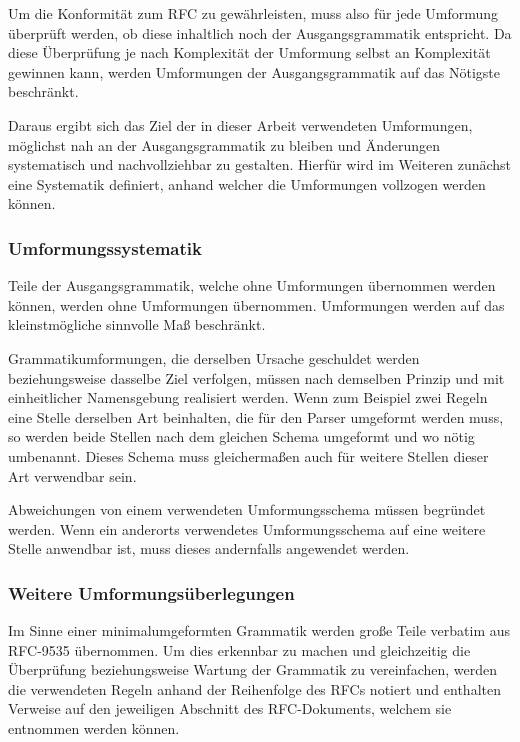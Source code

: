 \documentclass[oneside]{ausarbeitung}
\begin{document}
Um die Konformität zum RFC zu gewährleisten, muss also für jede Umformung überprüft werden, ob diese inhaltlich noch der Ausgangsgrammatik entspricht. Da diese Überprüfung je nach Komplexität der Umformung selbst an Komplexität gewinnen kann, werden Umformungen der Ausgangsgrammatik auf das Nötigste beschränkt. 
	
Daraus ergibt sich das Ziel der in dieser Arbeit verwendeten Umformungen, möglichst nah an der Ausgangsgrammatik zu bleiben und Änderungen systematisch und nachvollziehbar zu gestalten. Hierfür wird im Weiteren zunächst eine Systematik definiert, anhand welcher die Umformungen vollzogen werden können.
	
\subsubsection{Umformungssystematik}
	
Teile der Ausgangsgrammatik, welche ohne Umformungen übernommen werden können, werden ohne Umformungen übernommen. Umformungen werden auf das kleinstmögliche sinnvolle Maß beschränkt.
	
Grammatikumformungen, die derselben Ursache geschuldet werden beziehungsweise dasselbe Ziel verfolgen, müssen nach demselben Prinzip und mit einheitlicher Namensgebung realisiert werden. Wenn zum Beispiel zwei Regeln eine Stelle derselben Art beinhalten, die für den Parser umgeformt werden muss, so werden beide Stellen nach dem gleichen Schema umgeformt und wo nötig umbenannt. Dieses Schema muss gleichermaßen auch für weitere Stellen dieser Art verwendbar sein.
	
Abweichungen von einem verwendeten Umformungsschema müssen begründet werden. Wenn ein anderorts verwendetes Umformungsschema auf eine weitere Stelle anwendbar ist, muss dieses andernfalls angewendet werden. 
	
\subsubsection{Weitere Umformungsüberlegungen}
	
Im Sinne einer minimalumgeformten Grammatik werden große Teile verbatim aus RFC-9535 übernommen. Um dies erkennbar zu machen und gleichzeitig die Überprüfung beziehungsweise Wartung der Grammatik zu vereinfachen, werden die verwendeten Regeln anhand der Reihenfolge des RFCs notiert und enthalten Verweise auf den jeweiligen Abschnitt des RFC-Dokuments, welchem sie entnommen werden können. 
	
\end{document}

